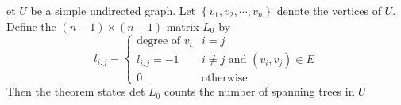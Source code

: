 \documentclass[12pt]{article}
\newenvironment{theorem}[2][Theorem]{\begin{trivlist}
\item[\hskip \labelsep {\bfseries #1}\hskip \labelsep {\bfseries #2.}]}{\end{trivlist}}
\begin{document}
\begin{theorem}
	Let $U$ be a simple undirected graph. Let $\left\{ v _ { 1 } , v _ { 2 } , \cdots , v _ { n } \right\}$ denote the vertices of $U$. Define the $( n - 1 ) \times ( n - 1 )$ matrix $L _ { 0 }$ by
	\[l_{i, j} = 
	\begin{cases} 
	\text{degree of } v _ { i } & i = j \\
	l _ { i , j } = - 1 & i \neq j \text{ and } (v_{ i },v _ { j }) \in E\\
	0 & \text{otherwise}
	\end{cases}\]
	Then the theorem states det $L_0$ counts the number of spanning trees in $U$
\end{theorem}
\end{document}

